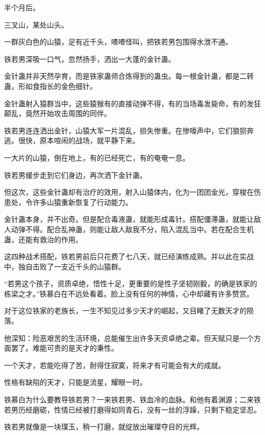 
\begin{this_body}



半个月后。

三叉山，某处山头。

一群灰白色的山猿，足有近千头，喳喳怪叫，把铁若男包围得水泄不通。

铁若男深吸一口气，忽然扬手，洒出一大蓬的金针蛊。

金针蛊并非天然孕育，而是铁家蛊师合炼得到的蛊虫。每一根金针蛊，都是二转蛊，形如食指长的金色细针。

金针蛊射入猿群当中，这些猿猴有的直接动弹不得，有的当场毒发毙命，有的发狂颠乱，竟然开始攻击周围的同伴。

铁若男连连洒出金针，山猿大军一片混乱，损失惨重。在惨嚎声中，它们狼狈奔逃。很快，原本喧闹的战场，就平静下来。

一大片的山猿，倒在地上，有的已经死亡，有的奄奄一息。

铁若男缓步走到它们身边，再次洒下金针蛊。

但这次，这些金针蛊却有治疗的效用，射入山猿体内，化为一团团金光，穿梭在伤患处，令许多山猿重新恢复了行动能力。

金针蛊本身，并不出奇。但是配合毒液蛊，就能形成毒针。搭配僵滞蛊，就能让敌人动弹不得。配合乱神蛊，则能让敌人敌我不分，陷入混乱当中。若在配合生机蛊，还能有救治的作用。

这四种战术搭配，铁若男前后只花费了七八天，就已经演练成熟。并以此在实战中，独自击败了一支近千头的山猿群。

“若男这个孩子，资质卓绝，悟性十足，更重要的是性子坚韧刚毅，的确是铁家的栋梁之才。”铁慕白在不远处看着。脸上没有任何的神情，心中却藏有许多赞赏。

对于这位铁家的老族长，一生不知见过多少天才的崛起，又目睹了无数天才的陨落。

他深知：险恶艰苦的生活环境，总能催生出许多天资卓绝之辈。但天赋只是一个方面罢了。难能可贵的是天才的秉性。

一个天才，若能吃得了苦，耐得住寂寞，将来才有可能会有大的成就。

性格有缺陷的天才，只能是流星，耀眼一时。

铁慕白为什么要教导铁若男？一来铁若男、铁血冷的血脉。和他有着渊源；二来铁若男历经磨砺，性情已经被打磨得如同青石，没有一丝的浮躁，只剩下稳定坚忍。

铁若男就像是一块璞玉，稍一打磨，就绽放出璀璨夺目的光辉。


\end{this_body}
